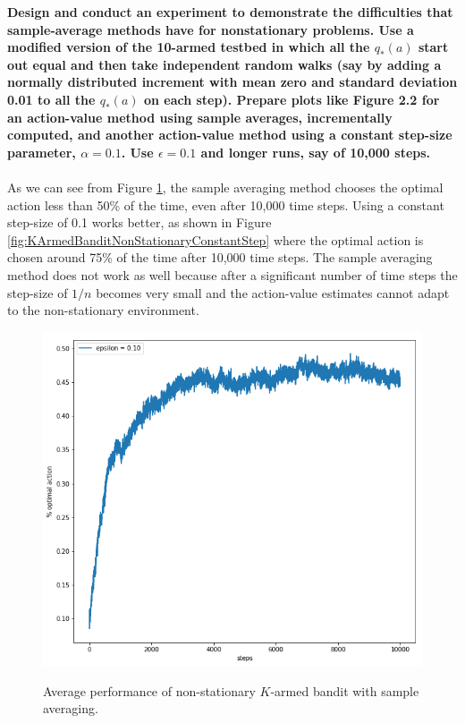 \documentclass[a4paper,11pt]{article}
\numberwithin{equation}{section}
\theoremstyle{remark}
\begin{document}
\textbf{Design and conduct an experiment to demonstrate the difficulties that sample-average methods have for nonstationary problems. Use a modified version of the 10-armed testbed in which all the $q_*(a)$ start out equal and then take independent random walks (say by adding a normally distributed increment with mean zero and standard deviation 0.01 to all the $q_*(a)$ on each step). Prepare plots like Figure 2.2 for an action-value method using sample averages, incrementally computed, and another action-value method using a constant step-size parameter, $\alpha = 0.1$. Use $\epsilon = 0.1$ and longer runs, say of 10,000 steps.}
\\ \\ 
As we can see from Figure \ref{fig:KArmedBanditNonStationarySampleAveraging}, the sample averaging method chooses the optimal action less than 50\% of the time, even after 10,000 time steps. Using a constant step-size of 0.1 works better, as shown in Figure \ref{fig:KArmedBanditNonStationaryConstantStep} where the optimal action is chosen around 75\% of the time after 10,000 time steps.  The sample averaging method does not work as well because after a significant number of time steps the step-size of $1/n$ becomes very small and the action-value estimates cannot adapt to the non-stationary environment.


\begin{figure}
	\centering
	\caption{Average performance of non-stationary $K$-armed bandit with sample averaging.}
	\includegraphics[scale=0.5]{ex2_5_1}
	\label{fig:KArmedBanditNonStationarySampleAveraging}
\end{figure}
\end{document}
